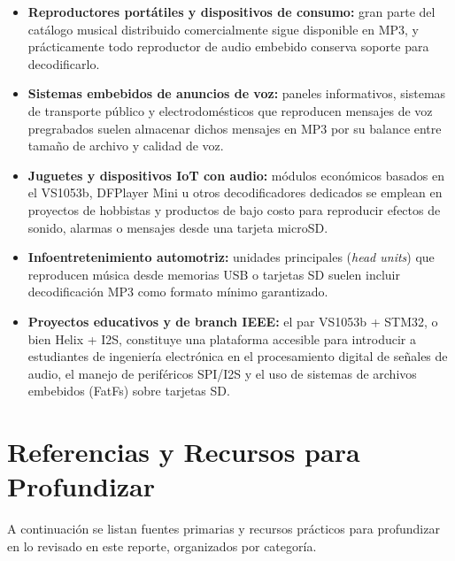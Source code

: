 \documentclass[pdflatex,sn-mathphys-num]{sn-jnl}%
\begin{document}
\begin{itemize}
    \item \textbf{Reproductores portátiles y dispositivos de consumo:} gran parte del catálogo musical distribuido comercialmente sigue disponible en MP3, y prácticamente todo reproductor de audio embebido conserva soporte para decodificarlo.
    \item \textbf{Sistemas embebidos de anuncios de voz:} paneles informativos, sistemas de transporte público y electrodomésticos que reproducen mensajes de voz pregrabados suelen almacenar dichos mensajes en MP3 por su balance entre tamaño de archivo y calidad de voz.
    \item \textbf{Juguetes y dispositivos IoT con audio:} módulos económicos basados en el VS1053b, DFPlayer Mini u otros decodificadores dedicados se emplean en proyectos de hobbistas y productos de bajo costo para reproducir efectos de sonido, alarmas o mensajes desde una tarjeta microSD.
    \item \textbf{Infoentretenimiento automotriz:} unidades principales (\textit{head units}) que reproducen música desde memorias USB o tarjetas SD suelen incluir decodificación MP3 como formato mínimo garantizado.
    \item \textbf{Proyectos educativos y de branch IEEE:} el par VS1053b + STM32, o bien Helix + I2S, constituye una plataforma accesible para introducir a estudiantes de ingeniería electrónica en el procesamiento digital de señales de audio, el manejo de periféricos SPI/I2S y el uso de sistemas de archivos embebidos (FatFs) sobre tarjetas SD.
\end{itemize}

\section{Referencias y Recursos para Profundizar}\label{sec:references}
A continuación se listan fuentes primarias y recursos prácticos para profundizar en lo revisado en este reporte, organizados por categoría.
\end{document}
